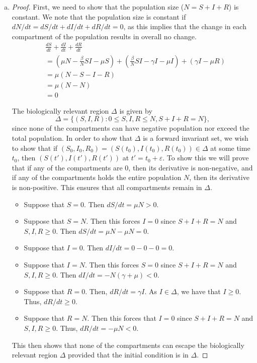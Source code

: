 \documentclass[12pt]{article}\usepackage[]{graphicx}\usepackage[]{color}
\begin{document}
\begin{enumerate}[(a)]

\item \SIRa
{\color{blue}\begin{proof}{\color{magenta}
First, we need to show that the population size ($N=S+I+R$) is constant. We note that the population size is constant if $dN/dt = dS/dt+dI/dt+dR/dt=0$, as this implies that the change in each compartment of the population results in overall no change. 
\begin{equation}
\begin{aligned}
& \frac{dS}{dt}+\frac{dI}{dt}+\frac{dR}{dt}\\
&=(\mu N-\frac{\beta}{N}SI-\mu S)+(\frac{\beta}{N}SI-\gamma I -\mu I)+(\gamma I-\mu R)\\
&= \mu (N-S-I-R)\\
&= \mu (N-N)\\
&= 0
\end{aligned}
\end{equation}

The biologically relevant region $\Delta$ is given by 
$$
\Delta = \{(S, I, R) : 0 \leq S,I,R \leq N, S+I+R = N\},
$$
since none of the compartments can have negative population nor exceed the total population. In order to show that $\Delta$ is a forward invariant set, we wish to show that if $(S_0, I_0, R_0) = (S(t_0), I(t_0), R(t_0)) \in \Delta$ at some time $t_0$, then $(S(t'), I(t'), R(t'))$ at $t' = t_0 + \varepsilon$. To show this we will prove that if any of the compartments are 0, then its derivative is non-negative, and if any of the compartments holds the entire population $N$, then its derivative is non-positive. This ensures that all compartments remain in $\Delta.$
\begin{itemize}
\item Suppose that $S=0$. Then $dS/dt = \mu N >0$.
\item Suppose that $S=N$. Then this forces $I = 0$ since $S+I+R = N$ and $S, I, R \geq 0$. Then $dS/dt = \mu N - \mu N = 0$.
\item Suppose that $I = 0$. Then $dI/dt = 0 - 0 - 0 = 0$. 
\item Suppose that $I = N$. Then this forces $S=0$ since $S+I+R = N$ and $S, I, R \geq 0$. Then $dI/dt = -N (\gamma + \mu) < 0$. 
\item Suppose that $R=0$. Then, $dR/dt=\gamma I$. As $I \in \Delta$, we have that $I \geq 0$. Thus, $dR/dt \geq 0$.
\item Suppose that $R=N$. Then this forces that $I=0$ since $S+I+R=N$ and $S,I, R \geq 0$. Thus, $dR/dt=-\mu N < 0$.
\end{itemize}
This then shows that none of the compartments can escape the biologically relevant region $\Delta$ provided that the initial condition is in $\Delta$.
}\end{proof}}


\end{enumerate}
\end{document}

